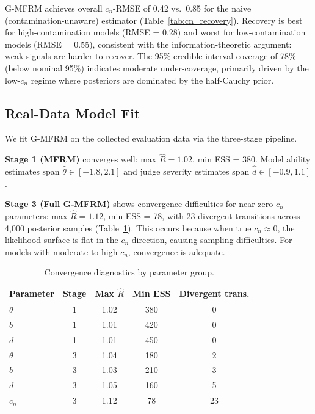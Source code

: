 \documentclass[11pt]{article}
\newcommand{\gmfrm}{G-MFRM}
\newcommand{\thetahat}{\hat{\theta}}
\newcommand{\cn}{c_n}
\begin{document}
\gmfrm{} achieves overall $\cn$-RMSE of 0.42 vs.\ 0.85 for the naive (contamination-unaware) estimator (Table~\ref{tab:cn_recovery}). Recovery is best for high-contamination models (RMSE = 0.28) and worst for low-contamination models (RMSE = 0.55), consistent with the information-theoretic argument: weak signals are harder to recover. The 95\% credible interval coverage of 78\% (below nominal 95\%) indicates moderate under-coverage, primarily driven by the low-$\cn$ regime where posteriors are dominated by the half-Cauchy prior.

\subsection{Real-Data Model Fit}
\label{sec:real_fit}

We fit \gmfrm{} on the collected evaluation data via the three-stage pipeline.

\textbf{Stage 1 (MFRM)} converges well: max $\hat{R} = 1.02$, min ESS = 380. Model ability estimates span $\thetahat \in [-1.8, 2.1]$ and judge severity estimates span $\hat{d} \in [-0.9, 1.1]$.

\textbf{Stage 3 (Full \gmfrm{})} shows convergence difficulties for near-zero $\cn$ parameters: max $\hat{R} = 1.12$, min ESS = 78, with 23 divergent transitions across 4,000 posterior samples (Table~\ref{tab:convergence}). This occurs because when true $\cn \approx 0$, the likelihood surface is flat in the $\cn$ direction, causing sampling difficulties. For models with moderate-to-high $\cn$, convergence is adequate.

\begin{table}[t]
\centering
\caption{Convergence diagnostics by parameter group.}
\label{tab:convergence}
\small
\begin{tabular}{lcccc}
\toprule
Parameter & Stage & Max $\hat{R}$ & Min ESS & Divergent trans. \\
\midrule
$\theta$ & 1 & 1.02 & 380 & 0 \\
$b$ & 1 & 1.01 & 420 & 0 \\
$d$ & 1 & 1.01 & 450 & 0 \\
\midrule
$\theta$ & 3 & 1.04 & 180 & 2 \\
$b$ & 3 & 1.03 & 210 & 3 \\
$d$ & 3 & 1.05 & 160 & 5 \\
$\cn$ & 3 & 1.12 & 78 & 23 \\
\bottomrule
\end{tabular}
\end{table}
\end{document}
